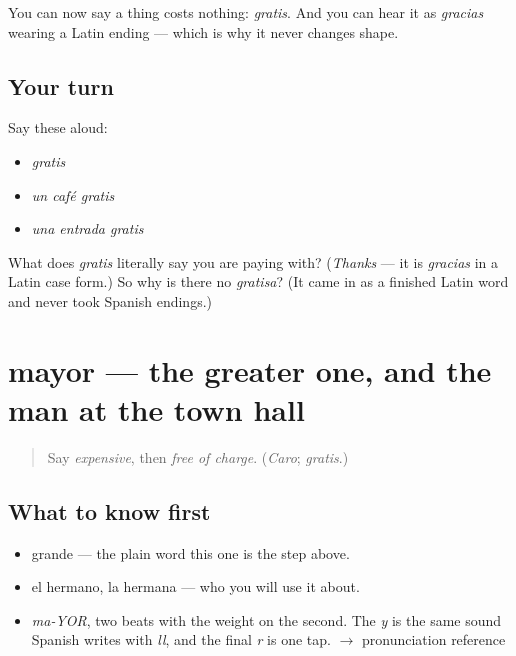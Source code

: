 \begin{grammarlens}[title={What you've built}]
You can now say a thing costs nothing: \emph{gratis}. And you can hear it as \emph{gracias} wearing a Latin ending — which is why it never changes shape.
\end{grammarlens}

\subsection*{Your turn}
Say these aloud:

\begin{itemize}
\raggedright
  \item \emph{gratis}
  \item \emph{un café gratis}
  \item \emph{una entrada gratis}
\end{itemize}

\begin{tcolorbox}[breakable,colback=teal!4,colframe=teal!35!black,title={Before you move on}]
What does \emph{gratis} literally say you are paying with? (\emph{Thanks} — it is \emph{gracias} in a Latin case form.) So why is there no \emph{gratisa}? (It came in as a finished Latin word and never took Spanish endings.)
\end{tcolorbox}
\section[mayor]{mayor — the greater one, and the man at the town hall}

\label{lesson:ES-C397-mayor}



\begin{quote}
Say \emph{expensive}, then \emph{free of charge}. (\emph{Caro}; \emph{gratis}.)
\end{quote}

\subsection*{What to know first}
\begin{itemize}
\raggedright
  \item grande — the plain word this one is the step above.
  \item el hermano, la hermana — who you will use it about.
\end{itemize}

\begin{sounds}
\begin{itemize}
\raggedright
  \item \emph{ma-YOR}, two beats with the weight on the second. The \emph{y} is the same sound Spanish writes with \emph{ll}, and the final \emph{r} is one tap. $\to$ pronunciation reference
\end{itemize}
\end{sounds}

